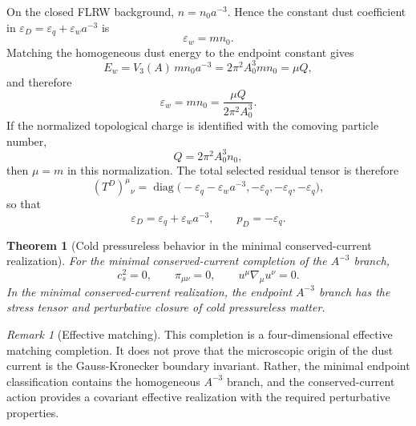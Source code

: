 \documentclass[11pt,a4paper]{article}
\numberwithin{equation}{section}
\newtheorem{theorem}[criterion]{Theorem}
\theoremstyle{remark}
\newtheorem{remark}[criterion]{Remark}
\newcommand{\epsD}{\varepsilon_D}
\newcommand{\pD}{p_D}
\newcommand{\diag}{\operatorname{diag}}
\begin{document}
On the closed FLRW background, \(n=n_0a^{-3}\). Hence the constant dust coefficient in \(\epsD=\varepsilon_q+\varepsilon_w a^{-3}\) is
\begin{equation}
\varepsilon_w=mn_0.
\end{equation}
Matching the homogeneous dust energy to the endpoint constant gives
\begin{equation}
E_w=V_3(A)\,mn_0a^{-3}=2\pi^2A_0^3mn_0=\mu Q,
\end{equation}
and therefore
\begin{equation}
\varepsilon_w=mn_0=\frac{\mu Q}{2\pi^2A_0^3}.
\end{equation}
If the normalized topological charge is identified with the comoving particle number,
\begin{equation}
Q=2\pi^2A_0^3n_0,
\end{equation}
then \(\mu=m\) in this normalization.
The total selected residual tensor is therefore
\begin{equation}
(T^D)^\mu{}_{\nu}
=\diag\bigl(-\varepsilon_q-\varepsilon_w a^{-3},
-\varepsilon_q,-\varepsilon_q,-\varepsilon_q\bigr),
\end{equation}
so that
\begin{equation}
\epsD=\varepsilon_q+\varepsilon_w a^{-3},
\qquad
\pD=-\varepsilon_q.
\end{equation}

\begin{theorem}[Cold pressureless behavior in the minimal conserved-current realization]
For the minimal conserved-current completion of the \(A^{-3}\) branch,
\begin{equation}
c_s^2=0,
\qquad
\pi_{\mu\nu}=0,
\qquad
u^\mu\nabla_\mu u^\nu=0.
\end{equation}
In the minimal conserved-current realization, the endpoint \(A^{-3}\) branch has the stress tensor and perturbative closure of cold pressureless matter.
\end{theorem}

\begin{remark}[Effective matching]
This completion is a four-dimensional effective matching completion. It does not prove that the microscopic origin of the dust current is the Gauss-Kronecker boundary invariant. Rather, the minimal endpoint classification contains the homogeneous \(A^{-3}\) branch, and the conserved-current action provides a covariant effective realization with the required perturbative properties.
\end{remark}
\end{document}
